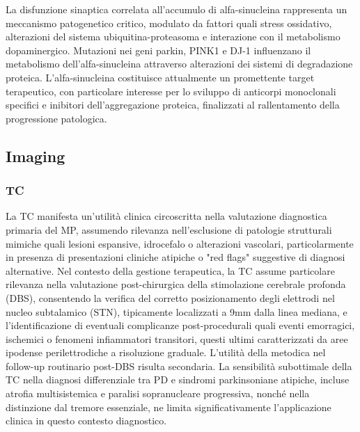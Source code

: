 La disfunzione sinaptica correlata all'accumulo di alfa-sinucleina rappresenta un meccanismo patogenetico critico, modulato da fattori quali stress ossidativo, alterazioni del sistema ubiquitina-proteasoma e interazione con il metabolismo dopaminergico. Mutazioni nei geni parkin, PINK1 e DJ-1 influenzano il metabolismo dell'alfa-sinucleina attraverso alterazioni dei sistemi di degradazione proteica.
L'alfa-sinucleina costituisce attualmente un promettente target terapeutico, con particolare interesse per lo sviluppo di anticorpi monoclonali specifici e inibitori dell'aggregazione proteica, finalizzati al rallentamento della progressione patologica.

\subsection{Imaging}

\subsubsection{TC}
La TC manifesta un'utilità clinica circoscritta nella valutazione diagnostica primaria del MP, assumendo rilevanza nell'esclusione di patologie strutturali mimiche quali lesioni espansive, idrocefalo o alterazioni vascolari, particolarmente in presenza di presentazioni cliniche atipiche o "red flags" suggestive di diagnosi alternative.
Nel contesto della gestione terapeutica, la TC assume particolare rilevanza nella valutazione post-chirurgica della stimolazione cerebrale profonda (DBS), consentendo la verifica del corretto posizionamento degli elettrodi nel nucleo subtalamico (STN), tipicamente localizzati a 9mm dalla linea mediana, e l'identificazione di eventuali complicanze post-procedurali quali eventi emorragici, ischemici o fenomeni infiammatori transitori, questi ultimi caratterizzati da aree ipodense perilettrodiche a risoluzione graduale. L'utilità della metodica nel follow-up routinario post-DBS risulta secondaria.
La sensibilità subottimale della TC nella diagnosi differenziale tra PD e sindromi parkinsoniane atipiche, incluse atrofia multisistemica e paralisi sopranucleare progressiva, nonché nella distinzione dal tremore essenziale, ne limita significativamente l'applicazione clinica in questo contesto diagnostico.

